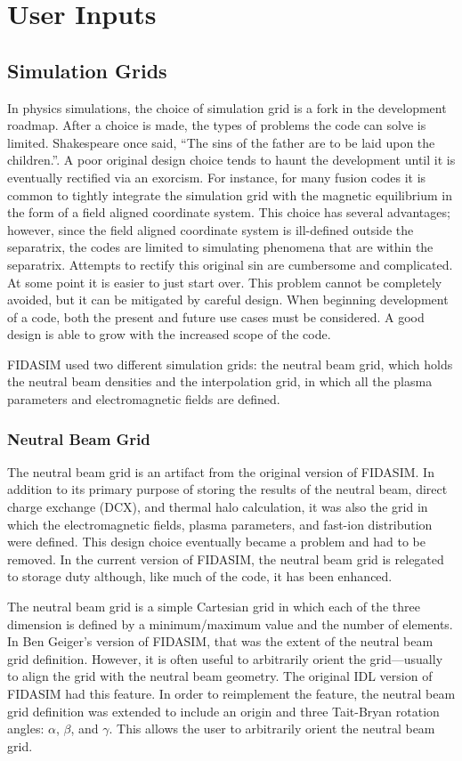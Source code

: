 \section{User Inputs}
\subsection{Simulation Grids}
In physics simulations, the choice of simulation grid is a fork in the development roadmap. After a choice is made, the types of problems the code can solve is limited. Shakespeare once said, “The sins of the father are to be laid upon the children.”. A poor original design choice tends to haunt the development until it is eventually rectified via an exorcism. For instance, for many fusion codes it is common to tightly integrate the simulation grid with the magnetic equilibrium in the form of a field aligned coordinate system. This choice has several advantages; however, since the field aligned coordinate system is ill-defined outside the separatrix, the codes are limited to simulating phenomena that are within the separatrix. Attempts to rectify this original sin are cumbersome and complicated. At some point it is easier to just start over. 
This problem cannot be completely avoided, but it can be mitigated by careful design. When beginning development of a code, both the present and future use cases must be considered. A good design is able to grow with the increased scope of the code.

FIDASIM used two different simulation grids: the neutral beam grid, which holds the neutral beam densities and the interpolation grid, in which all the plasma parameters and electromagnetic fields are defined.
\subsubsection{Neutral Beam Grid}
The neutral beam grid is an artifact from the original version of FIDASIM. In addition to its primary purpose of storing the results of the neutral beam, direct charge exchange (DCX), and thermal halo calculation, it was also the grid in which the electromagnetic fields, plasma parameters, and fast-ion distribution were defined. This design choice eventually became a problem and had to be removed. In the current version of FIDASIM, the neutral beam grid is relegated to storage duty although, like much of the code, it has been enhanced.

The neutral beam grid is a simple Cartesian grid in which each of the three dimension is defined by a minimum/maximum value and the number of elements. In Ben Geiger's version of FIDASIM, that was the extent of the neutral beam grid definition. However, it is often useful to arbitrarily orient the grid---usually to align the grid with the neutral beam geometry. The original IDL version of FIDASIM had this feature. In order to reimplement the feature, the neutral beam grid definition was extended to include an origin and three Tait-Bryan rotation angles: $\alpha$, $\beta$, and $\gamma$. This allows the user to arbitrarily orient the neutral beam grid.

